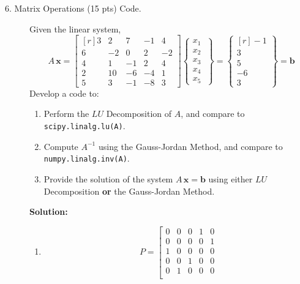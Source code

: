 \documentclass[12pt]{article}
\newcommand{\B}[1]{{\bm #1}}
\begin{document}
\begin{description}
\item[6. Matrix Operations (15 pts) Code.] Given the linear system,
\begin{equation*}
        A \, \B{x} = \begin{bmatrix*}[r] 3 & 2 & 7 & -1 & 4 \\ 6 & -2 & 0 & 2 & -2 \\ 4 & 1 & -1 & 2 & 4 \\ 2 & 10 & -6 & -4 & 1 \\ 5 & 3 & -1 & -8 & 3\end{bmatrix*} \begin{Bmatrix*} x_1\\ x_2\ \\ x_3\\ x_4\\ x_5\end{Bmatrix*} = \begin{Bmatrix*}[r] -1\\  3\\ 5\\ -6\\ 3\end{Bmatrix*} = \B{b}
    \end{equation*}
    Develop a code to:
    \begin{enumerate}[label=(\textbf{\alph*})]
        \item Perform the $L U$ Decomposition of $A$, and compare to 
        \verb|scipy.linalg.lu(A)|.
        \item Compute $A^{-1}$ using the Gauss-Jordan Method, and compare to 
        \verb|numpy.linalg.inv(A)|.
        \item Provide the solution of the system $A \, \B{x} = \B{b}$ using either $LU$ Decomposition {\bf{or}} the Gauss-Jordan Method.
    \end{enumerate}
    
\ifsolution
\color{red}
 {\bf Solution:}  \\
   \begin{enumerate}[label=(\textbf{\alph*})]
    \item
        \begin{equation*}
        P=
        \left[
          \begin{array}{ccccc}
      		 0        &      0       &       0   &      1       &       0   \\
     		 0        &      0       &       0   &      0       &       1   \\
     		  1        &      0       &       0   &      0       &       0   \\
     		  0        &      0       &       1   &      0       &       0   \\
     		  0        &      1       &       0   &      0       &       0   \\


\end{array}
\end{equation*}
\end{enumerate}
\end{description}
\end{document}
